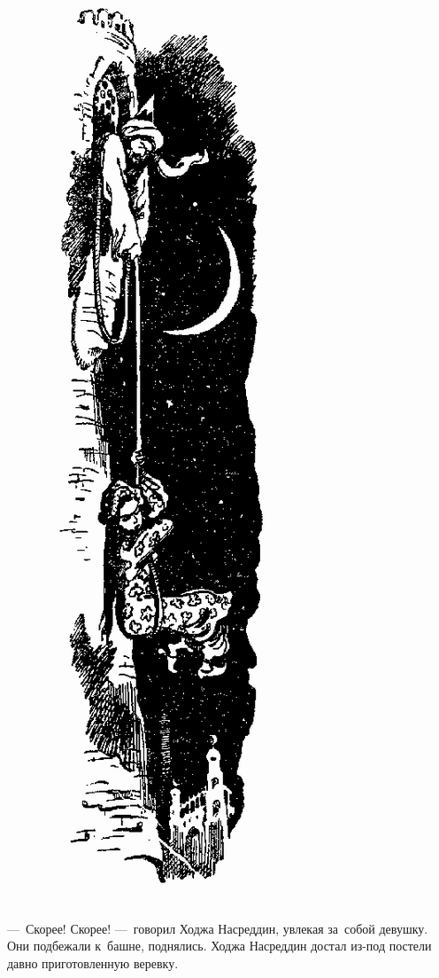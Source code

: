 \documentclass[12pt,a4paper]{book}
\begin{document}
\begin{figure}[p]
\centering
\includegraphics[scale=0.55]{17.png}
\end{figure}

—~Скорее! Скорее! —~говорил Ходжа Насреддин, увлекая за~собой девушку. Они подбежали к~башне, поднялись. Ходжа Насреддин достал из-под постели давно приготовленную веревку.
\end{document}
